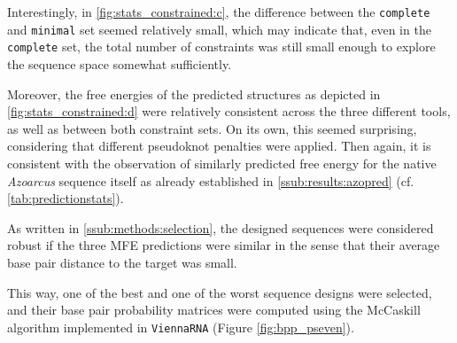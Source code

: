 \documentclass[../../master.tex]{subfiles}
\begin{document}
Interestingly, in \autoref{fig:stats_constrained:c}, the difference between the \texttt{complete} and \texttt{minimal} set seemed relatively small, which may indicate that, even in the \texttt{complete} set, the total number of constraints was still small enough to explore the sequence space somewhat sufficiently.

Moreover, the free energies of the predicted structures as depicted in \autoref{fig:stats_constrained:d} were relatively consistent across the three different tools, as well as between both constraint sets.
On its own, this seemed surprising, considering that different pseudoknot penalties were applied.
Then again, it is consistent with the observation of similarly predicted free energy for the native \textit{Azoarcus} sequence itself as already established in \autoref{ssub:results:azopred} (cf. \autoref{tab:predictionstats}).

As written in \autoref{ssub:methods:selection}, the designed sequences were considered robust if the three MFE predictions were similar in the sense that their average base pair distance to the target was small.

This way, one of the best and one of the worst sequence designs were selected, and their base pair probability matrices were computed using the McCaskill algorithm implemented in \texttt{ViennaRNA} (Figure \ref{fig:bpp_pseven}).
\end{document}
